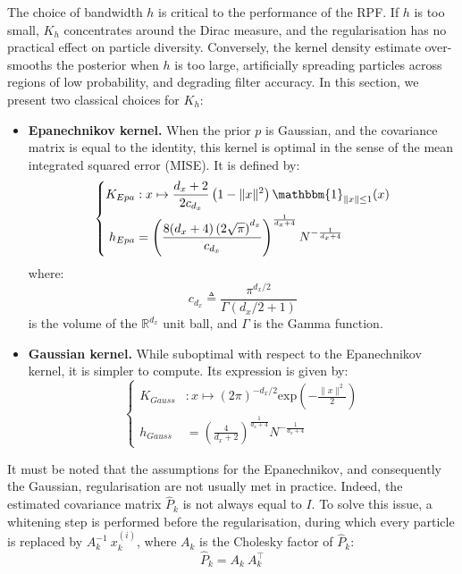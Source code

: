The choice of bandwidth $h$ is critical to the performance of the RPF. If $h$ is too small, $K_h$ concentrates around the Dirac measure, and the regularisation has no practical effect on particle diversity. Conversely, the kernel density estimate over-smooths the posterior when $h$ is too large, artificially spreading particles across regions of low probability, and degrading filter accuracy. In this section, we present two classical choices for $K_h$:
\begin{itemize}
	\item\textbf{Epanechnikov kernel.} When the prior $p$ is Gaussian, and the covariance matrix is equal to the identity, this kernel is optimal in the sense of the mean integrated squared error (MISE). It is defined by:
	\begin{equation}
		\left\{\begin{aligned}
		K_{Epa}&:x\mapsto\frac{d_x+2}{2c_{d_x}}\left(1-\|x\|^2\right)\mathbbm{1}_{\|x\|\leq1}(x)\\
		h_{Epa}&=\left(\frac{8(d_x+4)\left(2\sqrt{\pi}\right)^{d_x}}{c_{d_x}}\right)^{\frac{1}{d_x+4}}N^{-\frac{1}{d_x+4}}
		\end{aligned}\right.
	\end{equation}
	where:
	\begin{equation}
		c_{d_x}\triangleq\frac{\pi^{d_x/2}}{\Gamma(d_x/2+1)}
	\end{equation}
	is the volume of the $\mathbb{R}^{d_x}$ unit ball, and $\Gamma$ is the Gamma function.
	\item\textbf{Gaussian kernel.} While suboptimal with respect to the Epanechnikov kernel, it is simpler to compute. Its expression is given by:
	\begin{equation}
		\left\{\begin{aligned}
		K_{Gauss}&:x\mapsto(2\pi)^{-d_x/2}\text{exp}\left(-\frac{\|x\|^2}{2}\right)\\
		h_{Gauss}&=\left(\frac{4}{d_x+2}\right)^{\frac{1}{d_x+4}}N^{-\frac{1}{d_x+4}}
		\end{aligned}\right.
	\end{equation}
\end{itemize}

It must be noted that the assumptions for the Epanechnikov, and consequently the Gaussian, regularisation are not usually met in practice. Indeed, the estimated covariance matrix $\hat{P}_k$ is not always equal to $I$. To solve this issue, a whitening step is performed before the regularisation, during which every particle is replaced by $A_k^{-1}\:x_k^{(i)}$, where $A_k$ is the Cholesky factor of $\hat{P}_k$:
\begin{equation}
	\hat{P}_k=A_k\:A_k^\top
\end{equation}

